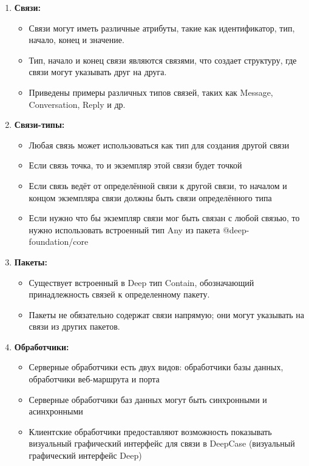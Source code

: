\documentclass{article}
\begin{document}
\begin{enumerate}
    \item \textbf{Связи:}
    \begin{itemize}
        \item Связи могут иметь различные атрибуты, такие как идентификатор, тип, начало, конец и значение.
        \item Тип, начало и конец связи являются связями, что создает структуру, где связи могут указывать друг на друга.
        \item Приведены примеры различных типов связей, таких как Message, Conversation, Reply и др.
    \end{itemize}

    \item \textbf{Связи-типы:}
    \begin{itemize}
        \item Любая связь может использоваться как тип для создания другой связи
        \item Если связь точка, то и экземпляр этой связи будет точкой
        \item Если связь ведёт от определённой связи к другой связи, то началом и концом экземпляра связи должны быть связи определённого типа
        \item Если нужно что бы экземпляр связи мог быть связан с любой связью, то нужно использовать встроенный тип Any из пакета @deep-foundation/core
    \end{itemize}
    
    \item \textbf{Пакеты:}
    \begin{itemize}
        \item Существует встроенный в Deep тип Contain, обозначающий принадлежность связей к определенному пакету.
        \item Пакеты не обязательно содержат связи напрямую; они могут указывать на связи из других пакетов.
    \end{itemize}
    
    \item \textbf{Обработчики:}
    \begin{itemize}
        \item Серверные обработчики есть двух видов: обработчики базы данных, обработчики веб-маршрута и порта
        \item Серверные обработчики баз данных могут быть синхронными и асинхронными
        \item Клиентские обработчики предоставляют возможность показывать визуальный графический интерфейс для связи в DeepCase (визуальный графический интерфейс Deep)
    \end{itemize}


\end{enumerate}
\end{document}
